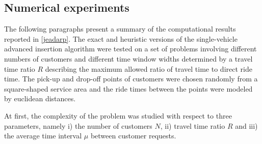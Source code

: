 \documentclass[dissertation,draft*]{aaltoseries}
\begin{document}
% 


\subsection{Numerical experiments}
\label{svexperience}
The following paragraphs present a summary of the computational results reported in \ref{jeadarp}. 
The exact and heuristic versions of the single-vehicle advanced insertion algorithm
were tested on a set of problems involving different numbers of customers and different time
window widths determined by a travel time ratio $R$ describing the maximum allowed ratio of travel time
to direct ride time. The pick-up and drop-off points of customers were chosen randomly from a
square-shaped service area and the ride times between the points were modeled by euclidean distances.

At first, the complexity of the problem was studied with respect to three parameters, namely
i) the number of customers $N$, ii) travel time ratio $R$ and iii) the average time interval $\mu$
between customer requests. 
\end{document}
